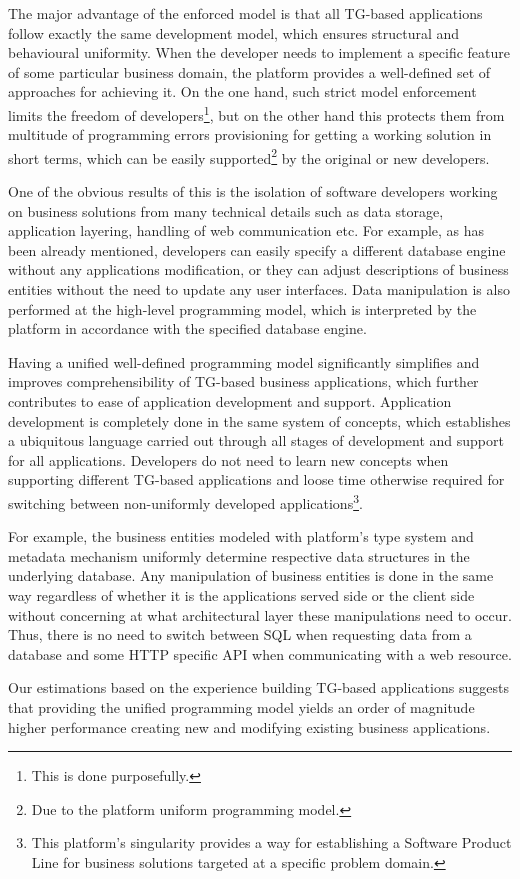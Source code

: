   The major advantage of the enforced model is that all TG-based applications follow exactly the same development model, which ensures structural and behavioural uniformity.
  When the developer needs to implement a specific feature of some particular business domain, the platform provides a well-defined set of approaches for achieving it.
  On the one hand, such strict model enforcement limits the freedom of developers\footnote{This is done purposefully.}, but on the other hand this protects them from multitude of programming errors provisioning for getting a working solution in short terms, which can be easily supported\footnote{Due to the platform uniform programming model.} by the original or new developers.

  One of the obvious results of this is the isolation of software developers working on business solutions from many technical details such as data storage, application layering, handling of web communication etc.
  For example, as has been already mentioned, developers can easily specify a different database engine without any applications modification, or they can adjust descriptions of business entities without the need to update any user interfaces.
  Data manipulation is also performed at the high-level programming model, which is interpreted by the platform in accordance with the specified database engine.
  
  Having a unified well-defined programming model significantly simplifies and improves comprehensibility of TG-based business applications, which further contributes to ease of application development and support.
  Application development is completely done in the same system of concepts, which establishes a ubiquitous language carried out through all stages of development and support for all applications.
  Developers do not need to learn new concepts when supporting different TG-based applications and loose time otherwise required for switching between non-uniformly developed applications\footnote{This platform's singularity provides a way for establishing a Software Product Line for business solutions targeted at a specific problem domain.}.
  
  For example, the business entities modeled with platform's type system and metadata mechanism uniformly determine respective data structures in the underlying database.
  Any manipulation of business entities is done in the same way regardless of whether it is the applications served side or the client side without concerning at what architectural layer these manipulations need to occur.
  Thus, there is no need to switch between SQL when requesting data from a database and some HTTP specific API when communicating with a web resource.

  Our estimations based on the experience building TG-based applications suggests that providing the unified programming model yields an order of magnitude higher performance creating new and modifying existing business applications.